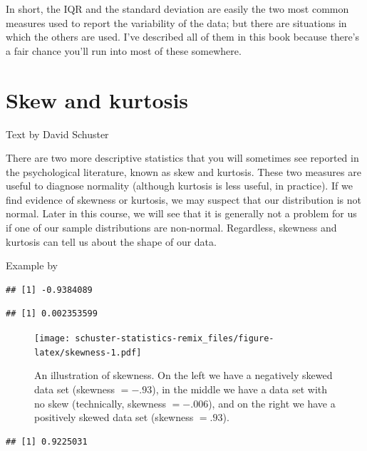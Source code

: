 \documentclass[
]{book}
\begin{document}
In short, the IQR and the standard deviation are easily the two most common measures used to report the variability of the data; but there are situations in which the others are used. I've described all of them in this book because there's a fair chance you'll run into most of these somewhere.

\hypertarget{skewandkurtosis}{%
\section{Skew and kurtosis}\label{skewandkurtosis}}

Text by David Schuster

There are two more descriptive statistics that you will sometimes see reported in the psychological literature, known as skew and kurtosis. These two measures are useful to diagnose normality (although kurtosis is less useful, in practice). If we find evidence of skewness or kurtosis, we may suspect that our distribution is not normal. Later in this course, we will see that it is generally not a problem for us if one of our sample distributions are non-normal. Regardless, skewness and kurtosis can tell us about the shape of our data.

Example by \citet{Navarro2018}

\begin{verbatim}
## [1] -0.9384089
\end{verbatim}

\begin{verbatim}
## [1] 0.002353599
\end{verbatim}

\begin{figure}
\centering
\texttt{[image: schuster-statistics-remix\_files/figure-latex/skewness-1.pdf]}
\caption{\label{fig:skewness}An illustration of skewness. On the left we have a negatively skewed data set (skewness \(= -.93\)), in the middle we have a data set with no skew (technically, skewness \(= -.006\)), and on the right we have a positively skewed data set (skewness \(= .93\)).}
\end{figure}

\begin{verbatim}
## [1] 0.9225031
\end{verbatim}
\end{document}
